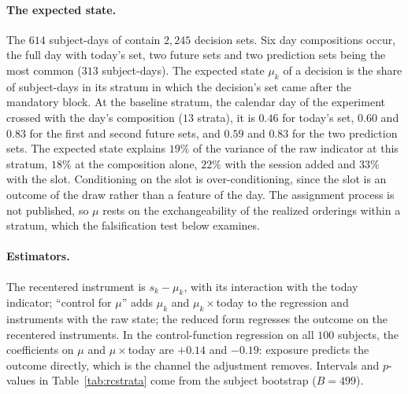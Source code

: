 \documentclass[11pt,a4paper]{article}
\theoremstyle{plain}
\theoremstyle{definition}
\begin{document}
\paragraph{The expected state.} The $614$ subject-days of \citet{augenblick2019} contain $2{,}245$ decision sets.
Six day compositions occur, the full day with today's set, two future sets and two prediction sets being the most
common ($313$ subject-days). The expected state $\mu_k$ of a decision is the share of subject-days in its stratum in
which the decision's set came after the mandatory block. At the baseline stratum, the calendar day of the experiment
crossed with the day's composition ($13$ strata), it is $0.46$ for today's set, $0.60$ and $0.83$ for the first and
second future sets, and $0.59$ and $0.83$ for the two prediction sets. The expected state explains $19\%$ of the
variance of the raw indicator at this stratum, $18\%$ at the composition alone, $22\%$ with the session added and
$33\%$ with the slot. Conditioning on the slot is over-conditioning, since the slot is an outcome of the draw rather
than a feature of the day. The assignment process is not published, so $\mu$ rests on the exchangeability of the
realized orderings within a stratum, which the falsification test below examines.

\paragraph{Estimators.} The recentered instrument is $s_k-\mu_k$, with its interaction with the today indicator;
``control for $\mu$'' adds $\mu_k$ and $\mu_k\times$today to the regression and instruments with the raw state; the
reduced form regresses the outcome on the recentered instruments. In the control-function regression on all $100$
subjects, the coefficients on $\mu$ and $\mu\times$today are $+0.14$ and $-0.19$: exposure predicts the outcome
directly, which is the channel the adjustment removes. Intervals and $p$-values in Table~\ref{tab:rcstrata} come from
the subject bootstrap ($B=499$).
\end{document}
